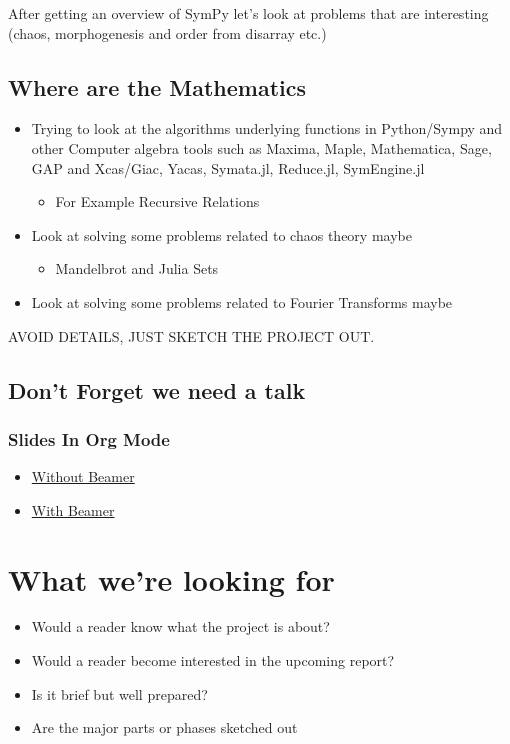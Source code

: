 \documentclass[11pt]{article}
\begin{document}
After getting an overview of SymPy let's look at problems that are interesting (chaos, morphogenesis and order from disarray etc.)


\subsection{Where are the Mathematics}
\label{sec:org9fe3ac9}

\begin{itemize}
\item Trying to look at the algorithms underlying functions in Python/Sympy and other Computer algebra tools such as Maxima, Maple, Mathematica, Sage, GAP and Xcas/Giac, Yacas, Symata.jl, Reduce.jl, SymEngine.jl
\begin{itemize}
\item For Example Recursive Relations
\end{itemize}
\item Look at solving some problems related to chaos theory maybe
\begin{itemize}
\item Mandelbrot and Julia Sets
\end{itemize}
\item Look at solving some problems related to Fourier Transforms maybe
\end{itemize}


AVOID DETAILS, JUST SKETCH THE PROJECT OUT.


\subsection{Don't Forget we need a talk}
\label{sec:org60dd603}
\subsubsection{Slides In Org Mode}
\label{sec:org849fcff}
\begin{itemize}
\item \href{https://orgmode.org/worg/org-tutorials/non-beamer-presentations.html}{Without Beamer}
\item \href{https://orgmode.org/worg/exporters/beamer/tutorial.html}{With Beamer}
\end{itemize}

\section{What we're looking for}
\label{sec:orgdaa04a3}

\begin{itemize}
\item Would a reader know what the project is about?
\item Would a reader become interested in the upcoming report?
\item Is it brief but well prepared?
\item Are the major parts or phases sketched out
\end{itemize}
\end{document}
